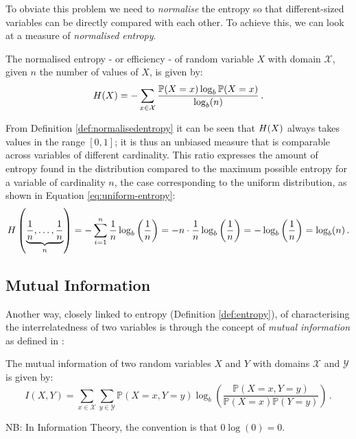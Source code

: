 To obviate this problem we need to \textit{normalise} the entropy so that different-sized variables can be directly compared with each other.
To achieve this, we can look at a measure of \textit{normalised entropy}.
\begin{definition} \label{def:normalisedentropy}
The normalised entropy - or efficiency - of random variable $X$ with domain $\mathcal{X}$, given $n$ the number of values of $X$, is given by:
	\begin{equation*} 
 	H(X)=-\sum\limits_{x \in \mathcal{X}} \frac{\mathbb{P}(X=x) \log _{b}\mathbb{P}(X=x)}{\log_{b}(n)} \,.
\end{equation*}
\end{definition}
From Definition \ref{def:normalisedentropy} it can be seen that $H(X)$ always takes values in the range $[0,1]$; it is thus an unbiased measure that is comparable across variables of different cardinality.
This ratio expresses the amount of entropy found in the distribution compared to the maximum possible entropy for a variable of cardinality $n$, the case corresponding to the uniform distribution, as shown in Equation \ref{eq:uniform-entropy}:
\begin{equation} \label{eq:uniform-entropy}
H \left(\underbrace{\frac{1}{n}, \ldots, \frac{1}{n}}_{n}\right) = - \sum\limits_{i=1}^n \frac{1}{n} \log _{b} \left( \frac{1}{n} \right) = -n \cdot \frac{1}{n} \log _{b} \left( \frac{1}{n} \right) = - \log _{b} \left( \frac{1}{n} \right) = \log _{b}(n) \,.
\end{equation}   

\subsection{Mutual Information} \label{subsec:mutual-information}
Another way, closely linked to entropy (Definition \ref{def:entropy}), of characterising the interrelatedness of two variables is through the concept of \textit{mutual information} as defined in \citet{Cover2006}:
\begin{definition}
	The mutual information of two random variables $X$ and $Y$ with domains $\mathcal{X}$ and $\mathcal{Y}$ is given by:
	\begin{equation*} \label{def:mutual-information}
		I(X,Y) = \sum\limits_{x \in \mathcal{X}} \sum\limits_{y \in \mathcal{Y}} \mathbb{P}(X=x,Y=y) \log_{b} \left( \frac{\mathbb{P}(X=x,Y=y)}{\mathbb{P}(X=x) \mathbb{P}(Y=y)} \right) \,.
	\end{equation*}
\end{definition}
NB: In Information Theory, the convention is that $0 \log(0) = 0$.

